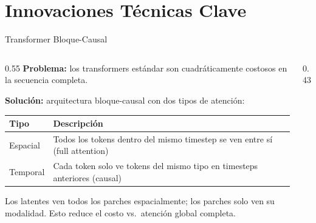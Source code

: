 \documentclass[aspectratio=169, 12pt]{beamer}
\begin{document}
\section{Innovaciones Técnicas Clave}

\begin{frame}{Transformer Bloque-Causal}
\begin{columns}[T]
  \begin{column}{0.55\textwidth}
    \textbf{Problema:} los transformers estándar son cuadráticamente costosos en la secuencia completa.

    \vspace{8pt}
    \textbf{Solución:} arquitectura bloque-causal con dos tipos de atención:

    \vspace{6pt}
    \begin{tabular}{p{2.2cm}p{4.2cm}}
      \toprule
      \textbf{Tipo} & \textbf{Descripción} \\
      \midrule
      Espacial & Todos los tokens dentro del mismo timestep se ven entre sí (full attention) \\
      \addlinespace
      Temporal & Cada token solo ve tokens del mismo tipo en timesteps anteriores (causal) \\
      \bottomrule
    \end{tabular}

    \vspace{8pt}
    \small Los latentes ven todos los parches espacialmente; los parches solo ven su modalidad. Esto reduce el costo vs.\ atención global completa.
  \end{column}
  \begin{column}{0.43\textwidth}
\end{column}
\end{columns}
\end{frame}
\end{document}
